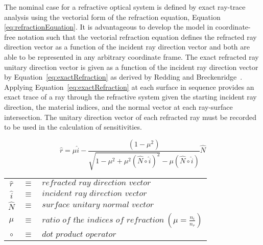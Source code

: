  The nominal case for a refractive optical system is defined by exact ray-trace analysis using the vectorial form of the refraction equation, Equation \eqref{eq:refractionEquation}. It is advantageous to develop the model in coordinate-free notation such that the vectorial refraction equation defines the refracted ray direction vector as a function of the incident ray direction vector and both are able to be represented in any arbitrary coordinate frame. The exact refracted ray unitary direction vector is given as a function of the incident ray direction vector by Equation~\eqref{eq:exactRefraction} as derived by Redding and Breckenridge~\cite{RedBreck}. Applying Equation~\eqref{eq:exactRefraction} at each surface in sequence provides an exact trace of a ray through the refractive system given the starting incident ray direction, the material indices, and the normal vector at each ray-surface intersection. The unitary direction vector of each refracted ray must be recorded to be used in the calculation of sensitivities.
 
\begin{table}		%
\centering
\begin{equation}
\label{eq:exactRefraction}
\hat{r} = \mu \hat{i} -  \frac{(1-\mu ^2)}{\sqrt{1-\mu ^2+\mu ^2(\hat{N}\circ\hat{i})^2}-\mu (\hat{N}\circ\hat{i})}\hat{N}
\end{equation}
\begin{tabular}{cll}
$\hat{r}$ & $\equiv$ & $\textit{refracted ray direction vector}$  \\
$\hat{i}$ & $\equiv$ & $\textit{incident ray direction vector}$     \\
$\hat{N}$ & $\equiv$ & $\textit{surface unitary normal vector}$ \\
$\mu$ & $\equiv$ & $\textit{ratio of the indices of refraction} \ \left (\mu  = \frac{n_i}{n_r} \right)$ \\
$\circ$ & $\equiv$ & $\textit{dot product operator}$
\end{tabular}
\end{table}

